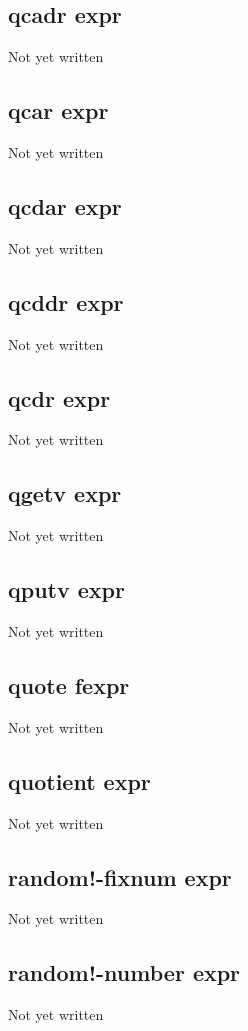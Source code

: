 \documentclass[a4paper,11pt]{article}
\begin{document}
\subsection{\ttfamily qcadr expr}
Not yet written

\subsection{\ttfamily qcar expr}
Not yet written

\subsection{\ttfamily qcdar expr}
Not yet written

\subsection{\ttfamily qcddr expr}
Not yet written

\subsection{\ttfamily qcdr expr}
Not yet written

\subsection{\ttfamily qgetv expr}
Not yet written

\subsection{\ttfamily qputv expr}
Not yet written

\subsection{\ttfamily quote fexpr}
Not yet written

\subsection{\ttfamily quotient expr}
Not yet written

\subsection{\ttfamily random!-fixnum expr}
Not yet written

\subsection{\ttfamily random!-number expr}
Not yet written
\end{document}
